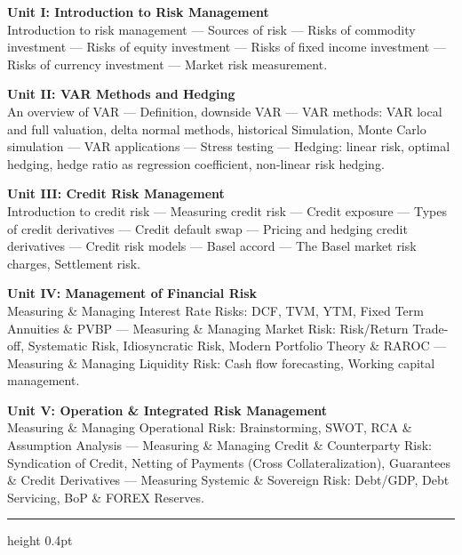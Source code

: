 \noindent\textbf{\footnotesize Unit I: Introduction to Risk Management}\\
\footnotesize
Introduction to risk management --- Sources of risk --- Risks of commodity investment --- Risks of equity investment --- Risks of fixed income investment --- Risks of currency investment --- Market risk measurement.

\vspace{0.2em}
\noindent\textbf{\footnotesize Unit II: VAR Methods and Hedging}\\
\footnotesize
An overview of VAR --- Definition, downside VAR --- VAR methods: VAR local and full valuation, delta normal methods, historical Simulation, Monte Carlo simulation --- VAR applications --- Stress testing --- Hedging: linear risk, optimal hedging, hedge ratio as regression coefficient, non-linear risk hedging.

\vspace{0.2em}
\noindent\textbf{\footnotesize Unit III: Credit Risk Management}\\
\footnotesize
Introduction to credit risk --- Measuring credit risk --- Credit exposure --- Types of credit derivatives --- Credit default swap --- Pricing and hedging credit derivatives --- Credit risk models --- Basel accord --- The Basel market risk charges, Settlement risk.

\vspace{0.2em}
\noindent\textbf{\footnotesize Unit IV: Management of Financial Risk}\\
\footnotesize
Measuring \& Managing Interest Rate Risks: DCF, TVM, YTM, Fixed Term Annuities \& PVBP --- Measuring \& Managing Market Risk: Risk/Return Trade-off, Systematic Risk, Idiosyncratic Risk, Modern Portfolio Theory \& RAROC --- Measuring \& Managing Liquidity Risk: Cash flow forecasting, Working capital management.

\vspace{0.2em}
\noindent\textbf{\footnotesize Unit V: Operation \& Integrated Risk Management}\\
\footnotesize
Measuring \& Managing Operational Risk: Brainstorming, SWOT, RCA \& Assumption Analysis --- Measuring \& Managing Credit \& Counterparty Risk: Syndication of Credit, Netting of Payments (Cross Collateralization), Guarantees \& Credit Derivatives --- Measuring Systemic \& Sovereign Risk: Debt/GDP, Debt Servicing, BoP \& FOREX Reserves.

\vspace{0.25em}
\hrule height 0.4pt
\vspace{0.3em}

